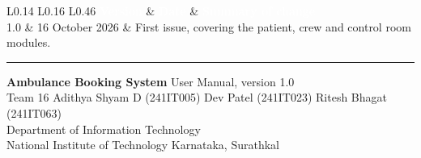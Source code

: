 \documentclass[11pt,a4paper]{article}
\newcommand{\thead}[1]{\textcolor{white}{\textbf{#1}}}
\newenvironment{reftable}[2]%
  {\begin{center}\small\begin{tabular}{#1}
   \rowcolor{dbimkey}#2\\}
  {\end{tabular}\end{center}}
\begin{document}
\begin{reftable}{L{0.14\linewidth} L{0.16\linewidth} L{0.46\linewidth}}{\thead{Version} & \thead{Date} & \thead{Summary of change}}
1.0 & 16 October 2026 & First issue, covering the patient, crew and control room modules. \\
\end{reftable}

\vspace{10mm}
\begin{center}
{\color{greyone}\rule{0.5\linewidth}{0.6pt}}

\vspace{5mm}
{\small\color{greythree}
\textbf{Ambulance Booking System} \textemdash{} User Manual, version 1.0\\[2mm]
Team 16 \textemdash{} Adithya Shyam D (241IT005) \textperiodcentered{}
Dev Patel (241IT023) \textperiodcentered{} Ritesh Bhagat (241IT063)\\[2mm]
Department of Information Technology\\
National Institute of Technology Karnataka, Surathkal}
\end{center}
\end{document}
